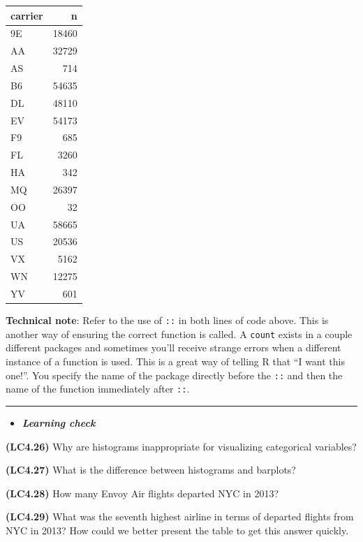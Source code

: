 \documentclass[]{tufte-book}
\let\oldrule=\rule
\renewcommand{\rule}[1]{\oldrule{\linewidth}}
\newenvironment{rmdblock}[1]
  {\begin{shaded*}
  \begin{itemize}
  \renewcommand{\labelitemi}{
    \raisebox{-.7\height}[0pt][0pt]{
    }
  }
  \item
  }
  {
  \end{itemize}
  \end{shaded*}
  }
\newenvironment{learncheck}
  {\begin{rmdblock}{warning}}
  {\end{rmdblock}}
\theoremstyle{definition}
\theoremstyle{definition}
\theoremstyle{remark}
\begin{document}
\begin{tabular}{l|r}
\hline
carrier & n\\
\hline
9E & 18460\\
\hline
AA & 32729\\
\hline
AS & 714\\
\hline
B6 & 54635\\
\hline
DL & 48110\\
\hline
EV & 54173\\
\hline
F9 & 685\\
\hline
FL & 3260\\
\hline
HA & 342\\
\hline
MQ & 26397\\
\hline
OO & 32\\
\hline
UA & 58665\\
\hline
US & 20536\\
\hline
VX & 5162\\
\hline
WN & 12275\\
\hline
YV & 601\\
\hline
\end{tabular}

\textbf{Technical note}: Refer to the use of \texttt{::} in both lines
of code above. This is another way of ensuring the correct function is
called. A \texttt{count} exists in a couple different packages and
sometimes you'll receive strange errors when a different instance of a
function is used. This is a great way of telling R that ``I want this
one!''. You specify the name of the package directly before the
\texttt{::} and then the name of the function immediately after
\texttt{::}.

\begin{center}\rule{0.5\linewidth}{\linethickness}\end{center}

\begin{learncheck}
\textbf{\emph{Learning check}}
\end{learncheck}

\textbf{(LC4.26)} Why are histograms inappropriate for visualizing
categorical variables?

\textbf{(LC4.27)} What is the difference between histograms and
barplots?

\textbf{(LC4.28)} How many Envoy Air flights departed NYC in 2013?

\textbf{(LC4.29)} What was the seventh highest airline in terms of
departed flights from NYC in 2013? How could we better present the table
to get this answer quickly.
\end{document}
